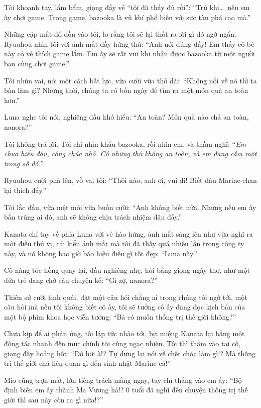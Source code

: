 \documentclass[../main.tex]{subfiles}
\begin{document}
Tôi khoanh tay, lẩm bẩm, giọng đầy vẻ ``tôi đã thấy đủ rồi'': ``Trừ khi\dots\ nếu em ấy chơi game. Trong game, bazooka là vũ khí phổ biến với sưc tàn phá cao mà.''

Những cặp mắt đổ dồn vào tôi, lo rằng tôi sẽ lại thốt ra lời gì đó ngớ ngẩn. Ryuuhou nhìn tôi với ánh mắt đầy hứng thú: ``Anh nói đúng đấy! Em thấy cô bé này có vẻ thích game lắm. Em ấy sẽ rất vui khi nhận được bazooka từ một người bạn cùng chơi game.''

Tôi nhún vai, nói một cách bất lực, vừa cười vừa thở dài: ``Không nói về nó thì ta bàn làm gì? Nhưng thôi, chúng ta có bốn ngày để tìm ra một món quà an toàn hơn.''

Luna nghe tôi nói, nghiêng đầu khó hiểu: ``An toàn? Món quà nào chả an toàn, nanora?''

Tôi không trả lời. Tôi chỉ nhìn khẩu bazooka, rồi nhìn em, và thầm nghĩ: ``\textit{Em chưa hiểu đâu, công chúa nhỏ. Có những thứ không an toàn, và em đang cầm một trong số đó.}''

Ryuuhou cười phá lên, vỗ vai tôi: ``Thôi nào, anh ơi, vui đi! Biết đâu Marine-chan lại thích đấy.''

Tôi lắc đầu, vừa mệt mỏi vừa buồn cười: ``Anh không biết nữa. Nhưng nếu em ấy bắn trúng ai đó, anh sẽ không chịu trách nhiệm đâu đấy.''

Kanata chỉ tay về phía Luna với vẻ hào hứng, ánh mắt sáng lên như vừa nghĩ ra một điều thú vị, cái kiểu ánh mắt mà tôi đã thấy quá nhiều lần trong công ty này, và nó không bao giờ báo hiệu điều gì tốt đẹp: ``Luna này.''

Cô nàng tóc hồng quay lại, đầu nghiêng nhẹ, hỏi bằng giọng ngây thơ, như một đứa trẻ đang chờ câu chuyện kể: ``Gì zợ, nanora?''

Thiên sứ cười tinh quái, đặt một câu hỏi chẳng ai trong chúng tôi ngờ tới, một câu hỏi mà nếu tôi không biết cô ấy, tôi sẽ tưởng cô ấy đang đọc kịch bản của một bộ phim khoa học viễn tưởng: ``Bà có muốn thống trị thế giới không?''

Chưa kịp để ai phản ứng, tôi lập tức nhào tới, bịt miệng Kanata lại bằng một động tác nhanh đến mức chính tôi cũng ngạc nhiên. Tôi thì thầm vào tai cô, giọng đầy hoảng hốt: ``Dở hơi à!? Tự dưng lại nói về chết chóc làm gì!? Mà thống trị thế giới chả liên quan gì đến sinh nhật Marine cả!''

Mio cũng trợn mắt, lớn tiếng trách mắng ngay, tay chỉ thẳng vào em ấy: ``Bộ định biến em ấy thành Ma Vương hả!? 0 tuổi đã nghĩ đến chuyện thống trị thế giới thì sau này còn ra gì nữa!?''
\end{document}
